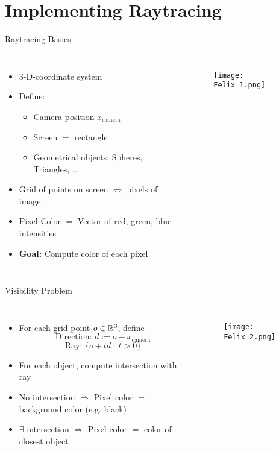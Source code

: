 \section{Implementing Raytracing}
\begin{frame}{Raytracing Basics}
\begin{columns}
    \begin{itemize}
   \item 3-D-coordinate system
   \item Define:
   \begin{itemize}
       \item Camera position $x_{\text{camera}}$
       \item Screen $=$ rectangle
       \item Geometrical objects: Spheres, Triangles, ...
   \end{itemize}
   \item Grid of points on screen $\Leftrightarrow$ pixels of image
   \item Pixel Color $=$ Vector of red, green, blue intensities
   \item \textbf{Goal:} Compute color of each pixel
   \end{itemize}
   \begin{figure}
                \centering
                \texttt{[image: Felix\_1.png]}
            \end{figure}
\end{columns}
\end{frame}

\begin{frame}{Visibility Problem}
    \begin{columns}
        \begin{itemize}
            \item For each grid point $o\in\mathbb{R}^3$, define 
            $$
            \text{Direction: }d := o - x_{\text{camera}}
            $$
            $$
            \text{Ray: } \{o + t d \ : \ t > 0\}
            $$
            \item For each object, compute intersection with ray
            \item No intersection $\Rightarrow$ Pixel color $=$ background color (e.g. black)
            \item $\exists$ intersection $\Rightarrow$ Pixel color $=$ color of closest object
        \end{itemize}
        \begin{figure}
                \centering
                \texttt{[image: Felix\_2.png]}
            \end{figure}
    \end{columns}
\end{frame}

